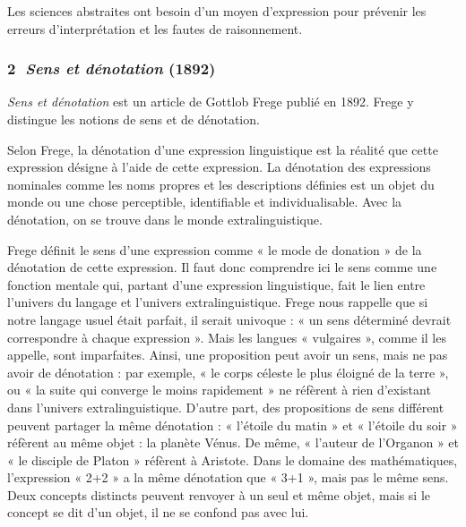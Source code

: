 \begin{lecture}{}
Les sciences abstraites ont besoin d’un moyen d’expression pour prévenir les erreurs d’interprétation et les fautes de raisonnement.
\end{lecture}

\subsubsection*{\textcircled{\scriptsize 2} \textit{Sens et dénotation} (1892)}
\textit{Sens et dénotation} est un article de Gottlob Frege publié en 1892. Frege y distingue les notions de sens et de dénotation.

Selon Frege, la dénotation d’une expression linguistique est la réalité que cette expression désigne à l’aide de cette expression. La dénotation des expressions nominales comme les noms propres et les descriptions définies est un objet du monde ou une chose perceptible, identifiable et individualisable. Avec la dénotation, on se trouve dans le monde extralinguistique.

Frege définit le sens d’une expression comme « le mode de donation » de la dénotation de cette expression. Il faut donc comprendre ici le sens comme une fonction mentale qui, partant d’une expression linguistique, fait le lien entre l’univers du langage et l’univers extralinguistique. Frege nous rappelle que si notre langage usuel était parfait, il serait univoque : « un sens déterminé devrait correspondre à chaque expression ». Mais les langues « vulgaires », comme il les appelle, sont imparfaites. Ainsi, une proposition peut avoir un sens, mais ne pas avoir de dénotation : par exemple, « le corps céleste le plus éloigné de la terre », ou « la suite qui converge le moins rapidement » ne réfèrent à rien d’existant dans l’univers extralinguistique. D’autre part, des propositions de sens différent peuvent partager la même dénotation : « l’étoile du matin » et « l’étoile du soir » réfèrent au même objet : la planète Vénus. De même, « l’auteur de l’Organon » et « le disciple de Platon » réfèrent à Aristote. Dans le domaine des mathématiques, l’expression « 2+2 » a la même dénotation que « 3+1 », mais pas le même sens. Deux concepts distincts peuvent renvoyer à un seul et même objet, mais si le concept se dit d’un objet, il ne se confond pas avec lui.

